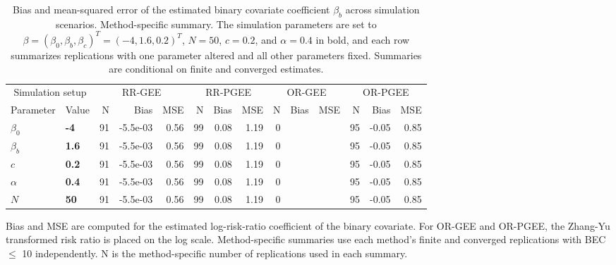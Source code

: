 \begin{table}[htbp]
\centering
\scriptsize
\setlength{\tabcolsep}{4pt}
\renewcommand{\arraystretch}{1.15}
\caption{Bias and mean-squared error of the estimated binary covariate coefficient $\beta_b$ across simulation scenarios. Method-specific summary. The simulation parameters are set to $\beta = (\beta_0, \beta_b, \beta_c)^T = (-4, 1.6, 0.2)^T$, $N = 50$, $c = 0.2$, and $\alpha = 0.4$ in bold, and each row summarizes replications with one parameter altered and all other parameters fixed. Summaries are conditional on finite and converged estimates.}
\begin{tabular}{ll|rrr|rrr|rrr|rrr}
\hline
\multicolumn{2}{c|}{Simulation setup} & \multicolumn{3}{c|}{RR-GEE} & \multicolumn{3}{c|}{RR-PGEE} & \multicolumn{3}{c|}{OR-GEE} & \multicolumn{3}{c}{OR-PGEE} \\
Parameter & Value & N & Bias & MSE & N & Bias & MSE & N & Bias & MSE & N & Bias & MSE \\
\hline
$\beta_0$ & \textbf{-4} & 91 & -5.5e-03 & 0.56 & 99 & 0.08 & 1.19 & 0 &  &  & 95 & -0.05 & 0.85 \\
\hline
$\beta_b$ & \textbf{1.6} & 91 & -5.5e-03 & 0.56 & 99 & 0.08 & 1.19 & 0 &  &  & 95 & -0.05 & 0.85 \\
\hline
$c$ & \textbf{0.2} & 91 & -5.5e-03 & 0.56 & 99 & 0.08 & 1.19 & 0 &  &  & 95 & -0.05 & 0.85 \\
\hline
$\alpha$ & \textbf{0.4} & 91 & -5.5e-03 & 0.56 & 99 & 0.08 & 1.19 & 0 &  &  & 95 & -0.05 & 0.85 \\
\hline
$N$ & \textbf{50} & 91 & -5.5e-03 & 0.56 & 99 & 0.08 & 1.19 & 0 &  &  & 95 & -0.05 & 0.85 \\
\hline
\end{tabular}
\begin{flushleft}
\footnotesize Bias and MSE are computed for the estimated log-risk-ratio coefficient of the binary covariate. For OR-GEE and OR-PGEE, the Zhang-Yu transformed risk ratio is placed on the log scale. Method-specific summaries use each method's finite and converged replications with BEC $\leq$ 10 independently. N is the method-specific number of replications used in each summary.
\end{flushleft}
\end{table}
